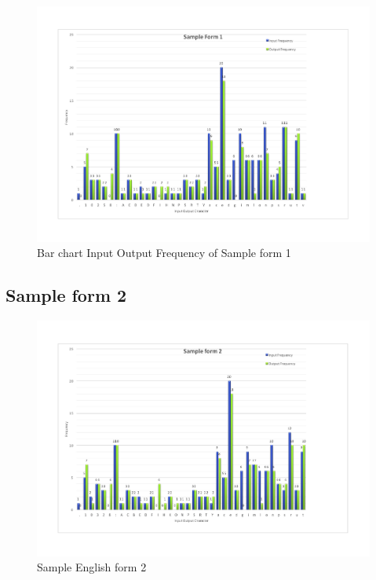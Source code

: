 \begin{figure}[H]
\centering
\includegraphics[width=1\textwidth]{form1.pdf}
\caption {Bar chart Input Output Frequency of Sample form 1}
\label {fig:bar1}
\end{figure}

\subsection{Sample form 2}

\begin{figure}[H]
\centering
\includegraphics[width=1\textwidth]{form2}
\caption {Sample English form 2}
\label {fig:form2}
\end{figure}

